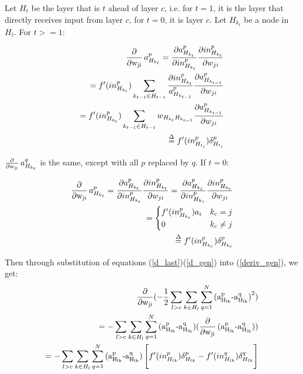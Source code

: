 Let $H_t$ be the layer that is $t$ ahead of layer $c$, i.e. for $t=1$, it is the layer that directly receives input from layer $c$, for $t=0$, it is layer $c$. Let $H_{k_t}$ be a node in $H_t$. For $t>=1$:

\begin{align}
    \Deriv a_{H_{k_t}}^p = \frac{\partial a_{H_{k_t}}^p}{\partial in_{H_{k_t}}^p}\frac{\partial in_{H_{k_t}}^p}{\partial w_{ji}} \\
    = f'(in_{H_{k_t}}^p)\sum_{k_{t-1}\in H_{t-1}} \frac{\partial in_{H_{k_t}}^p}{a_{H_{k_{t-1}}}^p} \frac{\partial a_{H_{k_{t-1}}}^p}{\partial w_{ji}} \\
    = f'(in_{H_{k_t}}^p) \sum_{k_{t-1}\in H_{t-1}} w_{H_{k_t}H_{k_{t-1}}} \frac{\partial a_{H_{k_{t-1}}}^p}{\partial w_{ji}} \\
    \overset{\Delta}{=} f'(in_{H_{t_i}}^p)\delta_{H_{t_i}}^p \label{d_gen}
\end{align}

$\operatorname{\frac{\partial}{\partial w_{ji}}} a_{H_{k_t}}^q$ is the same, except with all $p$ replaced by $q$. If $t=0$:

\begin{align}
    \Deriv a_{H_{k_t}}^p = \frac{\partial a_{H_{k_t}}^p}{\partial in_{H_{k_t}}^p}\frac{\partial in_{H_{k_t}}^p}{\partial w_{ji}} = \frac{\partial a_{H_{k_c}}^p}{\partial in_{H_{k_c}}^p}\frac{\partial in_{H_{k_c}}^p}{\partial w_{ji}} \\
    = 
    \begin{cases}
        f'(in_{H_{k_c}}^p)a_i & k_c = j \\
        0 & k_c \neq j
    \end{cases} \\
    \overset{\Delta}{=} f'(in_{H_{k_c}}^p)\delta_{H_{k_c}}^p \label{d_last}
\end{align}

Then through substitution of equations (\ref{d_last})(\ref{d_gen}) into (\ref{deriv_gen}), we get:
\begin{align}
    \operatorname{\frac{\partial}{\partial w_{ji}}} (-\frac{1}{2}\sum_{l>c}\sum_{k\in H_{l}}\sum_{q=1}^N \operatorname{(a_{H_{lk}}^p - a_{H_{lk}}^q)}^2) \\
    = -\sum_{l>c}\sum_{k\in H_{l}}\sum_{q=1}^N \operatorname{(a_{H_{lk}}^p - a_{H_{lk}}^q)} (\operatorname{\frac{\partial}{\partial w_{ji}}}\operatorname{(a_{H_{lk}}^p - a_{H_{lk}}^q)}) \\
    = -\sum_{l>c}\sum_{k\in H_{l}}\sum_{q=1}^N \operatorname{(a_{H_{lk}}^p - a_{H_{lk}}^q)}  \Bigg[f'(in_{H_{lk}}^p)\delta_{H_{lk}}^p - f'(in_{H_{lk}}^q)\delta_{H_{lk}}^q  \Bigg]
\end{align}
